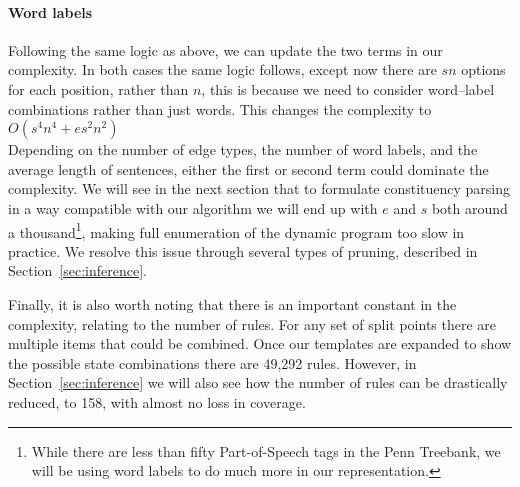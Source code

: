 \paragraph{Word labels}
Following the same logic as above, we can update the two terms in our complexity.
In both cases the same logic follows, except now there are $s n$ options for each position, rather than $n$, this is because we need to consider word--label combinations rather than just words.
This changes the complexity to $O(s^4 n^4 + e s^2 n^2)$ \\

Depending on the number of edge types, the number of word labels, and the average length of sentences, either the first or second term could dominate the complexity.
We will see in the next section that to formulate constituency parsing in a way compatible with our algorithm we will end up with $e$ and $s$ both around a thousand\footnote{
While there are less than fifty Part-of-Speech tags in the Penn Treebank, we will be using word labels to do much more in our representation.
}, making full enumeration of the dynamic program too slow in practice.
We resolve this issue through several types of pruning, described in Section~\ref{sec:inference}.

Finally, it is also worth noting that there is an important constant in the complexity, relating to the number of rules.
For any set of split points there are multiple items that could be combined.
Once our templates are expanded to show the possible state combinations there are 49,292 rules.
However, in Section~\ref{sec:inference} we will also see how the number of rules can be drastically reduced, to 158, with almost no loss in coverage.

